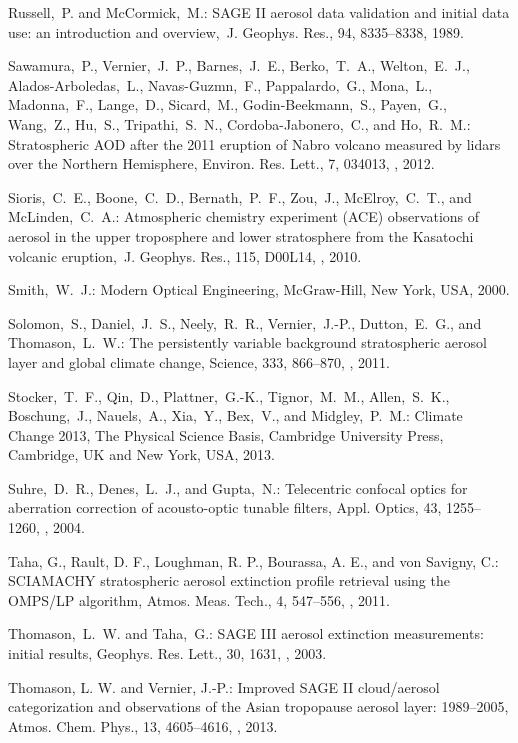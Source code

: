 \documentclass[amt]{copernicus}
\begin{document}
\begin{thebibliography}{99}
Russell,~P. and McCormick,~M.: SAGE II aerosol data validation and initial
data use: an introduction and overview,~J. Geophys. Res., 94, 8335--8338,
1989.


Sawamura,~P., Vernier,~J.~P., Barnes,~J.~E., Berko,~T.~A., Welton,~E.~J.,
Alados-Arboledas,~L., Navas-Guzmn,~F., Pappalardo,~G., Mona,~L., Madonna,~F.,
Lange,~D., Sicard,~M., Godin-Beekmann,~S., Payen,~G., Wang,~Z., Hu,~S.,
Tripathi,~S.~N., Cordoba-Jabonero,~C., and Ho,~R.~M.: Stratospheric AOD after
the 2011 eruption of Nabro volcano measured by lidars over the Northern
Hemisphere, Environ. Res. Lett., 7, 034013,
, 2012.


Sioris,~C.~E., Boone,~C.~D., Bernath,~P.~F., Zou,~J., McElroy,~C.~T., and
McLinden,~C.~A.: Atmospheric chemistry experiment (ACE) observations of
aerosol in the upper troposphere and lower stratosphere from the Kasatochi
volcanic eruption,~J. Geophys. Res., 115, D00L14,
,
2010.


Smith,~W.~J.: Modern Optical Engineering, McGraw-Hill, New York, USA, 2000.


Solomon,~S., Daniel,~J.~S., Neely,~R.~R., Vernier,~J.-P., Dutton,~E.~G., and
Thomason,~L.~W.: The persistently variable background stratospheric aerosol
layer and global climate change, Science, 333, 866--870,
,
2011.


Stocker,~T.~F., Qin,~D., Plattner,~G.-K., Tignor,~M.~M., Allen,~S.~K.,
Boschung,~J., Nauels,~A., Xia,~Y., Bex,~V., and Midgley,~P.~M.: Climate
Change 2013, The Physical Science Basis, Cambridge University Press,
Cambridge, UK and New York, USA, 2013.


Suhre,~D.~R., Denes,~L.~J., and Gupta,~N.: Telecentric confocal optics for
aberration correction of acousto-optic tunable filters, Appl. Optics, 43,
1255--1260,
,
2004.

Taha, G., Rault, D. F., Loughman, R. P., Bourassa, A. E., and von Savigny,
C.: SCIAMACHY stratospheric aerosol extinction profile retrieval using the
OMPS/LP algorithm, Atmos. Meas. Tech., 4, 547--556,
, 2011.

Thomason,~L.~W. and Taha,~G.: SAGE III aerosol extinction measurements:
initial results, Geophys. Res. Lett., 30, 1631, ,
2003.


Thomason, L. W. and Vernier, J.-P.: Improved SAGE II cloud/aerosol
categorization and observations of the Asian tropopause aerosol layer:
1989--2005, Atmos. Chem. Phys., 13, 4605--4616, ,
2013.



\end{thebibliography}
\end{document}
